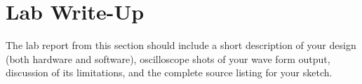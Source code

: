 \documentclass[12pt]{article}
\begin{document}
\section{Lab Write-Up}

The lab report from this section should include a short description of your design (both hardware and software), oscilloscope shots of your wave form output, discussion of its limitations, and the complete source listing for your sketch.
\end{document}
